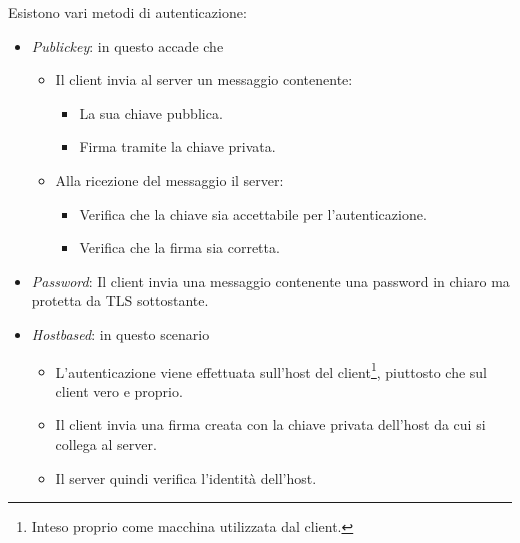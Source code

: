\documentclass[14pt]{extreport}
\begin{document}
Esistono vari metodi di autenticazione:


\begin{itemize}
    \item \textit{Publickey}: in questo accade che
    
    \begin{itemize}
        \item Il client invia al server un messaggio contenente:
        
        \begin{itemize}
            \item La sua chiave pubblica.
            \item Firma tramite la chiave privata.
        \end{itemize}
        
        \item Alla ricezione del messaggio il server:
        
        \begin{itemize}
            \item Verifica che la chiave sia accettabile per l'autenticazione.
            
            \item Verifica che la firma sia corretta.
        \end{itemize}
    \end{itemize}
    
    
    \item \textit{Password}: Il client invia una messaggio contenente una password in chiaro ma protetta da TLS sottostante.
    
    
    \item \textit{Hostbased}: in questo scenario
    
    \begin{itemize}
        \item L'autenticazione viene effettuata sull'host del client\footnote{Inteso proprio come macchina utilizzata dal client.}, piuttosto che sul client vero e proprio.
        
        \item Il client invia una firma creata con la chiave privata dell'host da cui si collega al server.
        
        \item Il server quindi verifica l'identità dell'host.
    \end{itemize}
\end{itemize}
\end{document}

